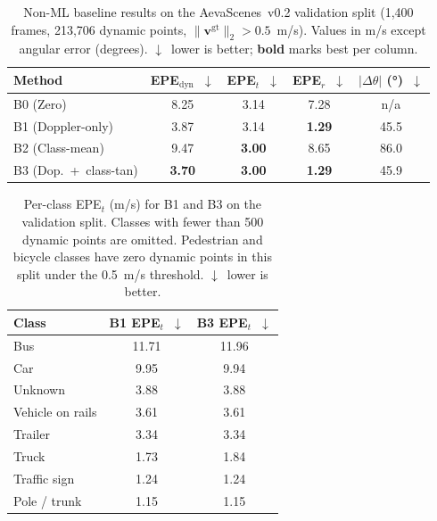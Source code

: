 \documentclass[a4paper,12pt]{article}
\begin{document}
\begin{table}[h]
\centering
\caption{Non-ML baseline results on the AevaScenes~v0.2 validation split (1{,}400 frames, 213{,}706 dynamic points, $\|\mathbf{v}^{\mathrm{gt}}\|_2 > 0.5$~m/s). Values in m/s except angular error (degrees). $\downarrow$~lower is better; \textbf{bold} marks best per column.}
\label{tab:t1_baselines}
\small
\begin{tabular}{lcccc}
\toprule
\textbf{Method} & \textbf{EPE$_\mathrm{dyn}$~$\downarrow$} & \textbf{EPE$_t$~$\downarrow$} & \textbf{EPE$_r$~$\downarrow$} & \textbf{$|\Delta\theta|$ (°)~$\downarrow$} \\
\midrule
B0 (Zero)                  & 8.25 & 3.14 & 7.28 & n/a  \\
B1 (Doppler-only)          & 3.87 & 3.14 & \textbf{1.29} & 45.5 \\
B2 (Class-mean)            & 9.47 & \textbf{3.00} & 8.65 & 86.0 \\
B3 (Dop.~+~class-tan)      & \textbf{3.70} & \textbf{3.00} & \textbf{1.29} & 45.9 \\
\bottomrule
\end{tabular}
\end{table}

\begin{table}[h]
\centering
\caption{Per-class EPE$_t$ (m/s) for B1 and B3 on the validation split. Classes with fewer than 500 dynamic points are omitted. Pedestrian and bicycle classes have zero dynamic points in this split under the 0.5~m/s threshold. $\downarrow$~lower is better.}
\label{tab:t2_perclass}
\small
\begin{tabular}{lcc}
\toprule
\textbf{Class} & \textbf{B1 EPE$_t$~$\downarrow$} & \textbf{B3 EPE$_t$~$\downarrow$} \\
\midrule
Bus              & 11.71 & 11.96 \\
Car              &  9.95 &  9.94 \\
Unknown          &  3.88 &  3.88 \\
Vehicle on rails &  3.61 &  3.61 \\
Trailer          &  3.34 &  3.34 \\
Truck            &  1.73 &  1.84 \\
Traffic sign     &  1.24 &  1.24 \\
Pole / trunk     &  1.15 &  1.15 \\
\bottomrule
\end{tabular}
\end{table}


\newpage
\end{document}
